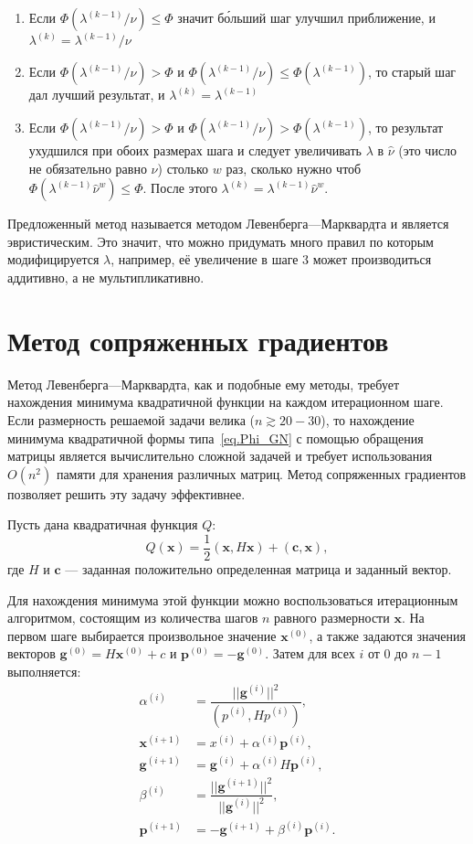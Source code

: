 \documentclass[fontsize=12pt, paper=a4]{article}
\renewcommand{\vec}[1]{\mathbf{#1}}
\def\x{\vec{x}}
\def\c{\vec{c}}
\begin{document}
\begin{enumerate}
 \item Если $\Phi(\lambda^{(k-1)} / \nu) \leq \Phi$ значит б\'{о}льший шаг улучшил приближение, и $\lambda^{(k)} = \lambda^{(k-1)} / \nu$
 \item Если $\Phi(\lambda^{(k-1)} / \nu) > \Phi$ и $\Phi(\lambda^{(k-1)} / \nu) \leq \Phi(\lambda^{(k-1)})$, то старый шаг дал лучший результат, и $\lambda^{(k)} = \lambda^{(k-1)}$
 \item Если $\Phi(\lambda^{(k-1)} / \nu) > \Phi$ и $\Phi(\lambda^{(k-1)} / \nu) > \Phi(\lambda^{(k-1)})$, то результат ухудшился при обоих размерах шага и следует увеличивать $\lambda$ в $\hat\nu$ (это число не обязательно равно $\nu$) столько $w$ раз, сколько нужно чтоб $\Phi(\lambda^{(k-1)} \hat\nu^w) \leq \Phi$.
  После этого $\lambda^{(k)} = \lambda^{(k-1)} \hat\nu^w$.
\end{enumerate}

Предложенный метод называется методом Левенберга---Марквардта и является эвристическим.
Это значит, что можно придумать много правил по которым модифицируется $\lambda$, например, её увеличение в шаге 3 может производиться аддитивно, а не мультипликативно.

\section{Метод сопряженных градиентов}
Метод Левенберга---Марквардта, как и подобные ему методы, требует нахождения минимума квадратичной функции на каждом итерационном шаге.
Если размерность решаемой задачи велика ($n \gtrsim 20-30$), то нахождение минимума квадратичной формы типа~\eqref{eq.Phi_GN} с помощью обращения матрицы является вычислительно сложной задачей и требует использования $O(n^2)$ памяти для хранения различных матриц.
Метод сопряженных градиентов позволяет решить эту задачу эффективнее.

Пусть дана квадратичная функция $Q$:
\begin{equation}
Q(\x) = \dfrac12 (\x, H \x) + (\c, \x),
\end{equation}
где $H$ и $\c$ --- заданная положительно определенная матрица и заданный вектор.

Для нахождения минимума этой функции можно воспользоваться итерационным алгоритмом, состоящим из количества шагов $n$ равного размерности $\x$.
На первом шаге выбирается произвольное значение $\x^{(0)}$, а также задаются значения векторов $\vec{g}^{(0)} = H\x^{(0)} + c$ и $\vec{p}^{(0)} = - \vec{g}^{(0)}$.
Затем для всех $i$ от 0 до $n-1$ выполняется:
\begin{equation}
\begin{split}
 \alpha^{(i)} &= \dfrac{||\vec{g}^{(i)}||^2}{(p^{(i)}, H p^{(i)})},\\
 \x^{(i+1)} &= x^{(i)} + \alpha^{(i)} \vec{p}^{(i)},\\
 \vec{g}^{(i+1)} &= \vec{g}^{(i)} + \alpha^{(i)} H \vec{p}^{(i)},\\
 \beta^{(i)} &= \dfrac{||\vec{g}^{(i+1)}||^2}{||\vec{g}^{(i)}||^2},\\
 \vec{p}^{(i+1)} &= -\vec{g}^{(i+1)} + \beta^{(i)} \vec{p}^{(i)}.
\end{split}
\end{equation}
\end{document}
